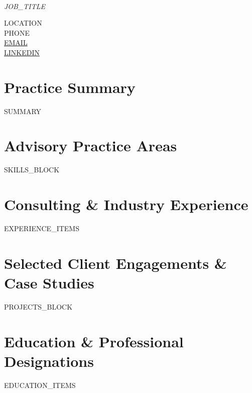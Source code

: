 \documentclass[10pt,letterpaper]{article}
\begin{document}
\begin{minipage}[c]{0.65\textwidth}
  {\LARGE \textbf{}} \\[3pt]
  {\normalsize \textit{{{JOB_TITLE}}}}
\end{minipage}
\hfill
\begin{minipage}[c]{0.33\textwidth}
  \raggedleft \small
  {{LOCATION}} \\
  {{PHONE}} \\
  \href{mailto:{{EMAIL}}}{{{EMAIL}}} \\
  \href{https://{{LINKEDIN}}}{{{LINKEDIN}}}
\end{minipage}

\vspace{6pt}

\section{Practice Summary}
\small
{{SUMMARY}}

\section{Advisory Practice Areas}
\small
{{SKILLS_BLOCK}}

\section{Consulting \& Industry Experience}
\small
{{EXPERIENCE_ITEMS}}

\section{Selected Client Engagements \& Case Studies}
\small
{{PROJECTS_BLOCK}}

\section{Education \& Professional Designations}
\small
{{EDUCATION_ITEMS}}
\end{document}
